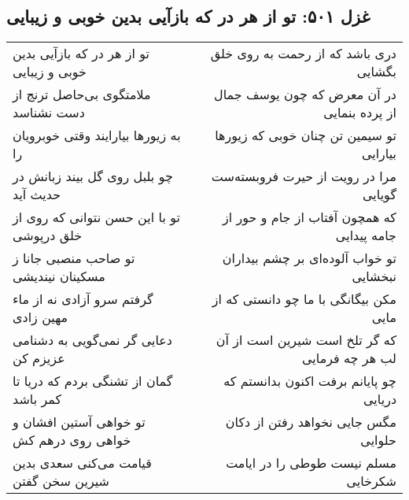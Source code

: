 \begin{center}
\section*{غزل ۵۰۱: تو از هر در که بازآیی بدین خوبی و زیبایی}
\label{sec:501}
\begin{longtable}{l p{0.5cm} r}
تو از هر در که بازآیی بدین خوبی و زیبایی
&&
دری باشد که از رحمت به روی خلق بگشایی
\\
ملامتگوی بی‌حاصل ترنج از دست نشناسد
&&
در آن معرض که چون یوسف جمال از پرده بنمایی
\\
به زیورها بیارایند وقتی خوبرویان را
&&
تو سیمین تن چنان خوبی که زیورها بیارایی
\\
چو بلبل روی گل بیند زبانش در حدیث آید
&&
مرا در رویت از حیرت فروبسته‌ست گویایی
\\
تو با این حسن نتوانی که روی از خلق درپوشی
&&
که همچون آفتاب از جام و حور از جامه پیدایی
\\
تو صاحب منصبی جانا ز مسکینان نیندیشی
&&
تو خواب آلوده‌ای بر چشم بیداران نبخشایی
\\
گرفتم سرو آزادی نه از ماء مهین زادی
&&
مکن بیگانگی با ما چو دانستی که از مایی
\\
دعایی گر نمی‌گویی به دشنامی عزیزم کن
&&
که گر تلخ است شیرین است از آن لب هر چه فرمایی
\\
گمان از تشنگی بردم که دریا تا کمر باشد
&&
چو پایانم  برفت اکنون بدانستم که دریایی
\\
تو خواهی آستین افشان و خواهی روی درهم کش
&&
مگس جایی نخواهد رفتن از دکان حلوایی
\\
قیامت می‌کنی سعدی بدین شیرین سخن گفتن
&&
مسلم نیست طوطی را در ایامت شکرخایی
\\
\end{longtable}
\end{center}
